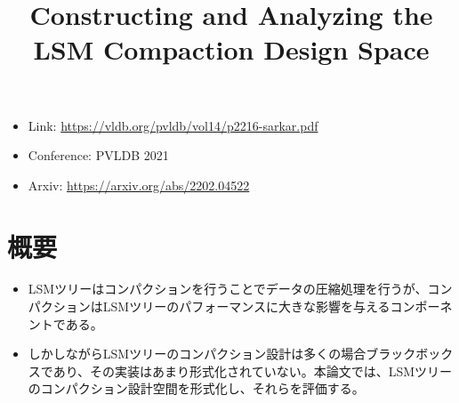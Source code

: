 \documentclass[dvipdfmx,uplatex]{jsarticle}
\title{Constructing and Analyzing the LSM Compaction Design Space}
\author{\empty}
\date{\empty}
\theoremstyle{remark}
\newenvironment{simplebox}{
    \begin{tcolorbox}[
        fonttitle=\bfseries,
    ]
}{
    \end{tcolorbox}
}
\begin{document}
\maketitle

\begin{itemize}
    \item Link: \url{https://vldb.org/pvldb/vol14/p2216-sarkar.pdf}
    \item Conference: PVLDB 2021
    \item Arxiv: \url{https://arxiv.org/abs/2202.04522}
\end{itemize}

\section{概要}
\begin{simplebox}
\begin{itemize}
    \item LSMツリーはコンパクションを行うことでデータの圧縮処理を行うが、コンパクションはLSMツリーのパフォーマンスに大きな影響を与えるコンポーネントである。
    \item しかしながらLSMツリーのコンパクション設計は多くの場合ブラックボックスであり、その実装はあまり形式化されていない。本論文では、LSMツリーのコンパクション設計空間を形式化し、それらを評価する。
\end{itemize}
\end{simplebox}
\end{document}
